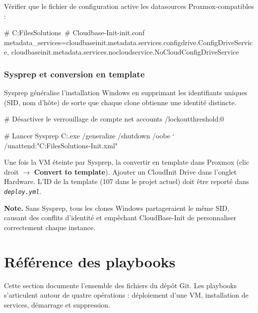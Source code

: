 \documentclass[a4paper]{article}
\newcommand{\file}[1]{\texttt{\textit{#1}}}
\begin{document}
Vérifier que le fichier de configuration active les datasources Proxmox-compatibles :

\begin{bashcode}
# C:\Program Files\Cloudbase Solutions\
#   Cloudbase-Init\conf\cloudbase-init.conf
metadata_services=cloudbaseinit.metadata.services.configdrive.ConfigDriveService,
  cloudbaseinit.metadata.services.nocloudservice.NoCloudConfigDriveService
\end{bashcode}

\subsubsection*{Sysprep et conversion en template}

Sysprep généralise l'installation Windows en supprimant les identifiants uniques (SID, nom d'hôte) de sorte que chaque clone obtienne une identité distincte.

\begin{bashcode}
# Désactiver le verrouillage de compte
net accounts /lockoutthreshold:0

# Lancer Sysprep
C:\Windows{}\Sysprep\sysprep.exe /generalize /shutdown /oobe `
  /unattend:"C:\Program Files\Cloudbase Solutions\Cloudbase-Init\conf\Unattend.xml"
\end{bashcode}

Une fois la VM éteinte par Sysprep, la convertir en template dans Proxmox (clic droit \(\to\) \textbf{Convert to template}). Ajouter un CloudInit Drive dans l'onglet Hardware. L'ID de la template (107 dans le projet actuel) doit être reporté dans \file{deploy.yml}.

\begin{infobox}
  \textbf{Note.} Sans Sysprep, tous les clones Windows partageraient le même SID, causant des conflits d'identité et empêchant CloudBase-Init de personnaliser correctement chaque instance.
\end{infobox}


\section{Référence des playbooks}

Cette section documente l'ensemble des fichiers du dépôt Git. Les playbooks s'articulent autour de quatre opérations : déploiement d'une VM, installation de services, démarrage et suppression.
\end{document}
